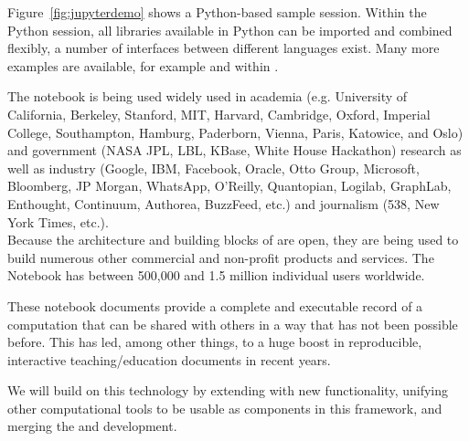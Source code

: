 Figure~\ref{fig:jupyterdemo} shows a Python-based sample
session. Within the Python session, all libraries available in Python
can be imported and combined flexibly, a number of interfaces between
different languages exist. Many more examples are available, for
example \cite{IPython-demo-hyperbolic-conservation-laws} and
within \cite{IPython-sload-foundation-report-2013}.

The \Jupyter notebook is being used widely used in academia
(e.g. University of California, Berkeley, Stanford,
MIT, Harvard, Cambridge, Oxford, Imperial College, Southampton,
Hamburg, Paderborn, Vienna, Paris, Katowice, and Oslo) and government
(NASA JPL, LBL, KBase, White House Hackathon) research as well as
industry (Google, IBM, Facebook, Oracle, Otto Group, Microsoft,
Bloomberg, JP Morgan, WhatsApp, O’Reilly, Quantopian, Logilab,
GraphLab, Enthought, Continuum, Authorea, BuzzFeed, etc.)  and
journalism (538, New York Times, etc.). \\
%
Because the architecture and building blocks of \Jupyter are open,
they are being used to build numerous other commercial and non-profit
products and services. The \Jupyter Notebook has between 500,000 and
1.5 million individual users worldwide.

These notebook documents provide a complete and executable record of a
computation that can be shared with others in a way that has not been
possible before. This has led, among other things, to a huge boost in
reproducible, interactive teaching/education documents in recent
years.

We will build on this technology by extending \Jupyter with new
functionality, unifying other computational tools to be usable as
components in this framework, and merging the \Sage and \Jupyter
development.



